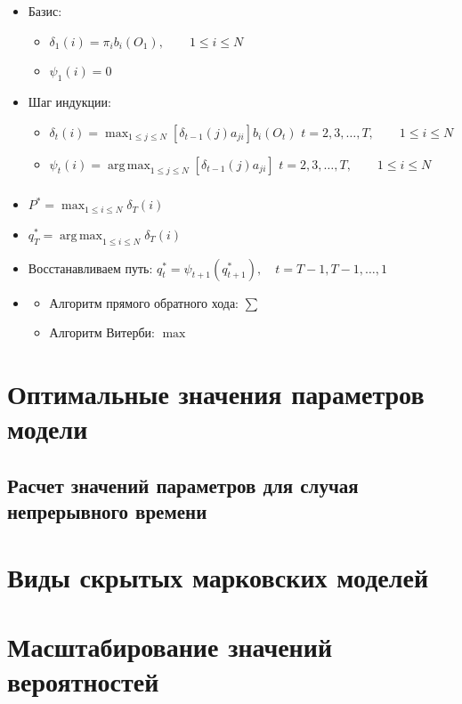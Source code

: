 \documentclass{beamer}
\DeclareMathOperator*{\argmax}{arg\,max}
\begin{document}
\begin{frame}
  \frametitle{\insertsection}
  \framesubtitle{\insertsubsection}
  \begin{itemize}
  \item Базис:
    \begin{itemize}
      \item $ \delta_1(i) = \pi_i b_i(O_1), \qquad 1 \le i \le N$ \\
      \item $\psi_1(i) = 0$
    \end{itemize}
    \pause
  \item Шаг индукции:
    \begin{itemize}
      \item $\displaystyle \delta_{t}(i) = \max_{1 \le j \le N}[\delta_{t - 1}(j) a_{ji}]b_{i}(O_{t})$
    $t = 2, 3, \ldots, T, \qquad 1 \le i \le N$ \\
        \pause
      \item $\displaystyle \psi_{t}(i) = \argmax_{1 \le j \le N}[\delta_{t - 1}(j) a_{ji}]$
        $t = 2, 3, \ldots, T, \qquad 1 \le i \le N$
    \end{itemize}
  \end{itemize}
\end{frame}

\begin{frame}
  \frametitle{\insertsection}
  \framesubtitle{\insertsubsection}
  \begin{itemize}
  \item $P^{\text{*}} = \max_{1 \le i \le N} \delta_T(i)$
    \pause
  \item $q^{\text{*}}_T = \argmax_{1 \le i \le N} \delta_T(i)$
  \item Восстанавливаем путь: $q^{\text{*}}_t = \psi_{t + 1}(q^{\text{*}}_{t + 1}), \quad t = T - 1, T - 1, \ldots, 1$
  \item \pause
    \begin{itemize}
    \item Алгоритм прямого обратного хода: $\sum$
    \item Алгоритм Витерби: $\max$
    \end{itemize}

  \end{itemize}
\end{frame}

\section{Оптимальные значения параметров модели}
\subsection{Расчет значений параметров для случая непрерывного времени}

\section{Виды скрытых марковских моделей}

\section{Масштабирование значений вероятностей}
\end{document}
